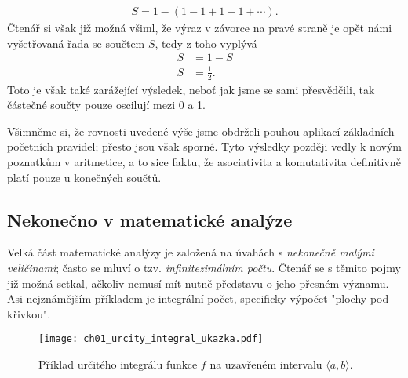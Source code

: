 \begin{align*}
S=1-(1-1+1-1+\cdots ) .
\end{align*}
Čtenář si však již možná všiml, že výraz v závorce na pravé straně je opět námi vyšetřovaná řada se součtem $S$, tedy z toho vyplývá
\begin{align*}
S&=1-S\\
S&=\frac{1}{2} .
\end{align*}
Toto je však také zarážející výsledek, neboť jak jsme se sami přesvědčili, tak částečné součty pouze oscilují mezi 0 a 1.\par
Všimněme si, že rovnosti uvedené výše jsme obdrželi pouhou aplikací základních početních pravidel; přesto jsou však sporné. Tyto výsledky později vedly k novým poznatkům v aritmetice, a to sice faktu, že asociativita a komutativita definitivně platí pouze u konečných součtů.

\subsection{Nekonečno v matematické analýze}

Velká část matematické analýzy je založená na úvahách s \emph{nekonečně malými veličinami}; často se mluví o tzv. \emph{infinitezimálním počtu}. Čtenář se s těmito pojmy již možná setkal, ačkoliv nemusí mít nutně představu o jeho přesném významu. Asi nejznámějším příkladem je integrální počet, specificky výpočet "plochy pod křivkou".
\begin{figure}[h]
	\centering
	\texttt{[image: ch01\_urcity\_integral\_ukazka.pdf]}
	\caption{Příklad určitého integrálu funkce $f$ na uzavřeném intervalu $\langle a,b \rangle$.}
	\label{fig:urcity_integral_ukazka}
\end{figure}


